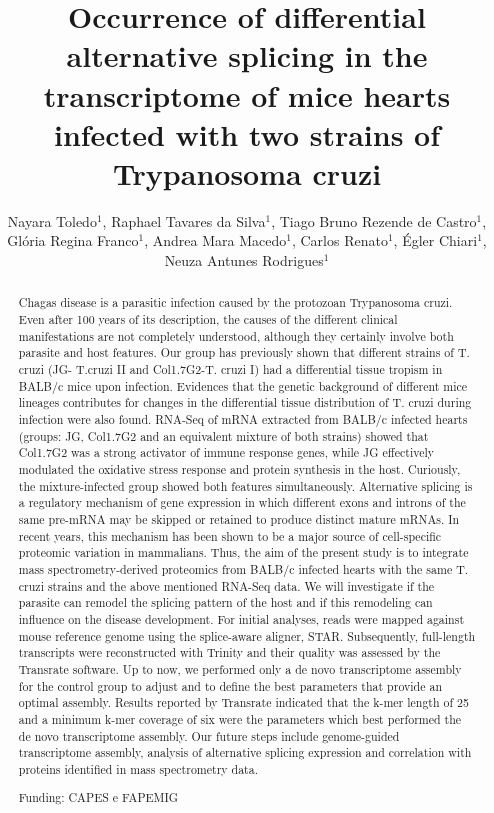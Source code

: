 \documentclass[twoside]{article}
\title{\vspace{-15mm}\fontsize{24pt}{10pt}\selectfont\textbf{Occurrence of differential alternative splicing in the transcriptome of mice hearts infected with two strains of Trypanosoma cruzi}} %
\author{Nayara Toledo$^1$, Raphael Tavares da Silva$^1$, Tiago Bruno Rezende de Castro$^1$, Gl\'oria Regina Franco$^1$, Andrea Mara Macedo$^1$, Carlos Renato$^1$, \'Egler Chiari$^1$, Neuza Antunes Rodrigues$^1$}
\affil{1 UFMG\\ }
\date{}
\begin{document}
\maketitle %

\thispagestyle{fancy} %


\begin{abstract}
Chagas disease is a parasitic infection caused by the protozoan Trypanosoma cruzi. Even after 100 years of its description, the causes of the different clinical manifestations are not completely understood, although they certainly involve both parasite and host features. Our group has previously shown that different strains of T. cruzi (JG- T.cruzi II and Col1.7G2-T. cruzi I) had a differential tissue tropism in BALB/c mice upon infection. Evidences that the genetic background of different mice lineages contributes for changes in the differential tissue distribution of T. cruzi during infection were also found. RNA-Seq of mRNA extracted from BALB/c infected hearts (groups: JG, Col1.7G2 and an equivalent mixture of both strains) showed that Col1.7G2 was a strong activator of immune response genes, while JG effectively modulated the oxidative stress response and protein synthesis in the host. Curiously, the mixture-infected group showed both features simultaneously. Alternative splicing is a regulatory mechanism of gene expression in which different exons and introns of the same pre-mRNA may be skipped or retained to produce distinct mature mRNAs. In recent years, this mechanism has been shown to be a major source of cell-specific proteomic variation in mammalians. Thus, the aim of the present study is to integrate mass spectrometry-derived proteomics from BALB/c infected hearts with the same T. cruzi strains and the above mentioned RNA-Seq data. We will investigate if the parasite can remodel the splicing pattern of the host and if this remodeling can influence on the disease development. For initial analyses, reads were mapped against mouse reference genome using the splice-aware aligner, STAR. Subsequently, full-length transcripts were reconstructed with Trinity and their quality was assessed by the Transrate software. Up to now, we performed only a de novo transcriptome assembly for the control group to adjust and to define the best parameters that provide an optimal assembly. Results reported by Transrate indicated that the k-mer length of 25 and a minimum k-mer coverage of six were the parameters which best performed the de novo transcriptome assembly. Our future steps include genome-guided transcriptome assembly, analysis of alternative splicing expression and correlation with proteins identified in mass spectrometry data.

Funding: CAPES e FAPEMIG
\end{abstract}
\end{document}
